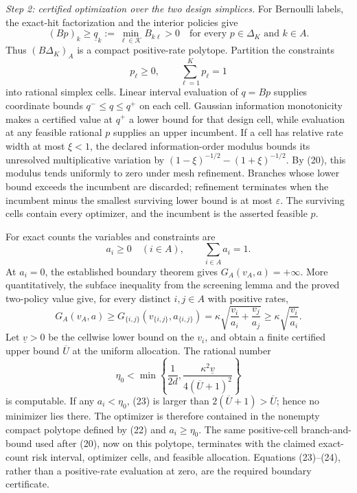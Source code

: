 \emph{Step 2: certified optimization over the two design simplices.}
For Bernoulli labels, the exact-hit factorization and the interior policies give
\[
(Bp)_k\geq\underline q_k:=\min_{\ell\in\mathcal K}B_{k\ell}>0
\quad\text{for every }p\in\Delta_K\text{ and }k\in A. \tag{20}
\]
Thus \((B\Delta_K)_A\) is a compact positive-rate polytope.  Partition the constraints
\[
p_\ell\geq0,\qquad \sum_{\ell=1}^Kp_\ell=1 \tag{21}
\]
into rational simplex cells.  Linear interval evaluation of \(q=Bp\) supplies coordinate bounds \(q^-\leq q\leq q^+\) on each cell.  Gaussian information monotonicity makes a certified value at \(q^+\) a lower bound for that design cell, while evaluation at any feasible rational \(p\) supplies an upper incumbent.  If a cell has relative rate width at most \(\xi<1\), the declared information-order modulus bounds its unresolved multiplicative variation by \((1-\xi)^{-1/2}-(1+\xi)^{-1/2}\).  By (20), this modulus tends uniformly to zero under mesh refinement.  Branches whose lower bound exceeds the incumbent are discarded; refinement terminates when the incumbent minus the smallest surviving lower bound is at most \(\varepsilon\).  The surviving cells contain every optimizer, and the incumbent is the asserted feasible \(p\).

For exact counts the variables and constraints are
\[
a_i\geq0\quad(i\in A),\qquad \sum_{i\in A}a_i=1. \tag{22}
\]
At \(a_i=0\), the established boundary theorem gives \(G_A(v_A,a)=+\infty\).  More quantitatively, the subface inequality from the screening lemma and the proved two-policy value give, for every distinct \(i,j\in A\) with positive rates,
\[
G_A(v_A,a)
\geq G_{\{i,j\}}(v_{\{i,j\}},a_{\{i,j\}})
=\kappa\sqrt{\frac{v_i}{a_i}+\frac{v_j}{a_j}}
\geq\kappa\sqrt{\frac{v_i}{a_i}}. \tag{23}
\]
Let \(\underline v>0\) be the cellwise lower bound on the \(v_i\), and obtain a finite certified upper bound \(\overline U\) at the uniform allocation.  The rational number
\[
\eta_0<\min\left\{\frac1{2d},
\frac{\kappa^2\underline v}{4(\overline U+1)^2}\right\} \tag{24}
\]
is computable.  If any \(a_i<\eta_0\), (23) is larger than \(2(\overline U+1)>\overline U\); hence no minimizer lies there.  The optimizer is therefore contained in the nonempty compact polytope defined by (22) and \(a_i\geq\eta_0\).  The same positive-cell branch-and-bound used after (20), now on this polytope, terminates with the claimed exact-count risk interval, optimizer cells, and feasible allocation.  Equations (23)--(24), rather than a positive-rate evaluation at zero, are the required boundary certificate.

